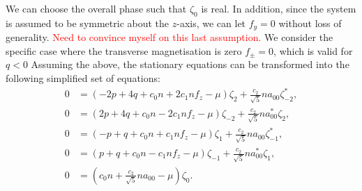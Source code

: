 We can choose the overall phase such that \(\zeta_0\) is real.
In addition, since the system is assumed to be symmetric about the \(z\)-axis,
we can let \(f_y=0\) without loss of generality.
\textcolor{red}{Need to convince myself on this last assumption.}
We consider the specific case where the transverse magnetisation is zero
\(f_{\pm} = 0\), which is valid for \(q < 0\)
Assuming the above, the stationary equations can be transformed into the
following simplified set of equations:
\begin{align}
    0 & = (-2p + 4q + c_0n + 2c_1nf_z - \mu)\zeta_2
    + \frac{c_2}{\sqrt{5}}na_{00}\zeta^*_{-2},
    \label{eq: spin-2-stationary-zeta2}                                 \\
    0 & = (2p + 4q + c_0n - 2c_1nf_z - \mu)\zeta_{-2}
    + \frac{c_2}{\sqrt{5}}na^*_{00}\zeta_{2},
    \label{eq: spin-2-stationary-zetam2}                                \\
    0 & = (-p + q + c_0n + c_1nf_z - \mu)\zeta_1
    + \frac{c_2}{\sqrt{5}}na_{00}\zeta^*_{-1},
    \label{eq: spin-2-stationary-zeta1}                                 \\
    0 & = (p + q + c_0n - c_1nf_z - \mu)\zeta_{-1}
    + \frac{c_2}{\sqrt{5}}na^*_{00}\zeta_1,
    \label{eq: spin-2-stationary-zetam1}                                \\
    0 & = \left(c_0n + \frac{c_2}{\sqrt{5}}na_{00} - \mu\right)\zeta_0.
    \label{eq: spin-2-stationary-zeta0}
\end{align}

